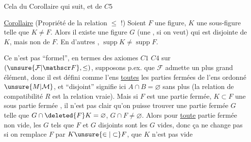 
Cela  du Corollaire qui suit, et de $C5$

\uline{Corollaire} (Propriété de la relation $\leq$ !) Soient $F$ une figure, $K$ une sous-figure  telle que $K\neq F$. Alors il existe une  figure $G$ (une , si on veut) qui est  disjointe de $K$, mais non de $F$. En d'autres , $\operatorname{supp} K\neq\operatorname{supp} F$.

Ce n'est pas ``formel'', en termes des axiomes $C1$ \unsure{:|;} $C4$ sur $(\unsure{\mathcal F|\mathscr F},\leq)$, supposons p.ex. que $\mathcal F$ admette un plus grand élément, donc il est défini comme l'ens  \uline{toutes} les parties fermées de l'ens ordonné $\unsure{M|\mathcal M}$, et ``disjoint'' signifie ici $A\cap B=\varnothing$ sans plus (la relation de compatibilité $R$ est la relation  vraie). Mais si $F$ est une partie fermée, $K\subset F$ une sous partie fermée , il n'est pas clair qu'on puisse trouver une partie fermée $G$ telle que $G\cap\deleted{F}K=\varnothing$, $G\cap F\neq\varnothing$.   Alors pour \uline{toute} partie fermée non vide, les $G$ tels que $F$ et $G$ disjoints sont les $G$ vides, donc ça ne change pas si on remplace $F$ par $K\unsure{\in|\subset}F$,  que $K$ n'est pas vide
